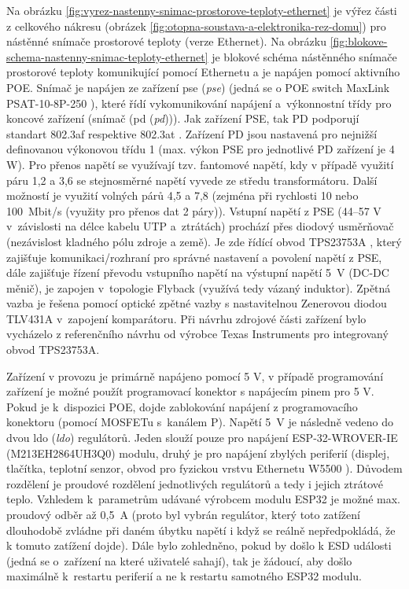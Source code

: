 Na obrázku \ref{fig:vyrez-nastenny-snimac-prostorove-teploty-ethernet} je výřez části z celkového nákresu (obrázek \ref{fig:otopna-soustava-a-elektronika-rez-domu}) pro nástěnné snímače prostorové teploty (verze Ethernet). Na obrázku \ref{fig:blokove-schema-nastenny-snimac-teploty-ethernet} je blokové schéma nástěnného snímače prostorové teploty komunikující pomocí Ethernetu a je napájen pomocí aktivního POE. Snímač je napájen ze zařízení \acrshort{pse} (\textit{\acrlong{pse}}) (jedná se o POE switch MaxLink PSAT-10-8P-250 \cite{maxlink-psat-10-8p-250}), které řídí vykomunikování napájení a~výkonnostní třídy pro koncové zařízení (snímač (\acrshort{pd} (\textit{\acrlong{pd}}))). Jak zařízení PSE, tak PD podporují standart 802.3af \cite{norma-802.3af} respektive 802.3at \cite{norma-802.3at}. Zařízení PD jsou nastavená pro nejnižší definovanou výkonovou třídu 1 (max. výkon PSE pro jednotlivé PD zařízení je 4 W). Pro přenos napětí se využívají tzv. fantomové napětí, kdy v případě využití páru 1,2 a 3,6 se stejnosměrné napětí vyvede ze středu transformátoru. Další možností je využití volných párů 4,5 a 7,8 (zejména při rychlosti 10 nebo 100~Mbit/s (využity pro přenos dat 2 páry)). Vstupní napětí z PSE (44–57 V v~závislosti na délce kabelu UTP a~ztrátách) prochází přes diodový usměrňovač (nezávislost kladného pólu zdroje a země). Je zde řídící obvod TPS23753A \cite{tps23753a}, který zajišťuje komunikaci/rozhraní pro správné nastavení a povolení napětí z PSE, dále zajišťuje řízení převodu vstupního napětí na výstupní napětí 5~V (DC-DC měnič), je zapojen v~topologie Flyback (využívá tedy vázaný induktor). Zpětná vazba je řešena pomocí optické zpětné vazby s nastavitelnou Zenerovou diodou TLV431A \cite{tlv431a} v~zapojení komparátoru. Při návrhu zdrojové části zařízení bylo vycházelo z referenčního návrhu od výrobce Texas Instruments pro integrovaný obvod TPS23753A.

Zařízení v provozu je primárně  napájeno pomocí 5 V, v případě programování zařízení je možné použít programovací konektor s napájecím pinem pro 5 V. Pokud je k~dispozici POE, dojde zablokování napájení z programovacího konektoru (pomocí MOSFETu s~kanálem P). Napětí 5~V je následně vedeno do dvou \acrshort{ldo} (\textit{\acrlong{ldo}}) regulátorů. Jeden slouží pouze pro napájení ESP-32-WROVER-IE (M213EH2864UH3Q0) \cite{esp32-wrover-ie} modulu, druhý je pro napájení zbylých periferií (displej, tlačítka, teplotní senzor, obvod pro fyzickou vrstvu Ethernetu W5500 \cite{w5500}). Důvodem rozdělení je proudové rozdělení jednotlivých regulátorů a tedy i jejich ztrátové teplo. Vzhledem k~parametrům udávané výrobcem modulu ESP32 je možné max. proudový odběr až 0,5~A (proto byl vybrán regulátor, který toto zatížení dlouhodobě zvládne při daném úbytku napětí i když se reálně nepředpokládá, že k tomuto zatížení dojde). Dále bylo zohledněno, pokud by došlo k ESD události (jedná se o~zařízení na které uživatelé sahají), tak je žádoucí, aby došlo maximálně k~restartu periferií a ne k restartu samotného ESP32 modulu. 

